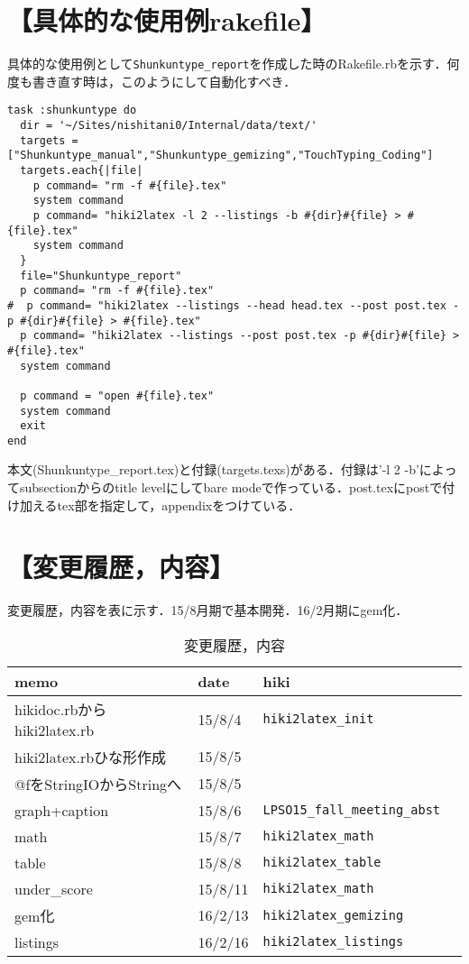 \documentclass[10pt,a4jpaper]{jsarticle}
\begin{document}
\section{【具体的な使用例rakefile】}
具体的な使用例として\verb|Shunkuntype_report|を作成した時のRakefile.rbを示す．何度も書き直す時は，このようにして自動化すべき．
\begin{lstlisting}[style=customRuby]
task :shunkuntype do
  dir = '~/Sites/nishitani0/Internal/data/text/'
  targets =["Shunkuntype_manual","Shunkuntype_gemizing","TouchTyping_Coding"]
  targets.each{|file|
    p command= "rm -f #{file}.tex"
    system command
    p command= "hiki2latex -l 2 --listings -b #{dir}#{file} > #{file}.tex"
    system command
  }
  file="Shunkuntype_report"
  p command= "rm -f #{file}.tex"
#  p command= "hiki2latex --listings --head head.tex --post post.tex -p #{dir}#{file} > #{file}.tex"
  p command= "hiki2latex --listings --post post.tex -p #{dir}#{file} > #{file}.tex"
  system command

  p command = "open #{file}.tex"
  system command
  exit
end
\end{lstlisting}
本文(Shunkuntype\_report.tex)と付録(targets.texs)がある．付録は'-l 2 -b'によってsubsectionからのtitle levelにしてbare modeで作っている．post.texにpostで付け加えるtex部を指定して，appendixをつけている．

\section{【変更履歴，内容】}
変更履歴，内容を表に示す．15/8月期で基本開発．16/2月期にgem化．

\begin{table}[htbp]\begin{center}
\caption{変更履歴，内容}
\begin{tabular}{llll}
\hline
memo   &date  &hiki  \\ \hline
hikidoc.rbからhiki2latex.rb  &15/8/4  &\verb|hiki2latex_init|  \\
hiki2latex.rbひな形作成  &15/8/5  \\
@fをStringIOからStringへ  &15/8/5  \\
graph+caption  &15/8/6  &\verb|LPSO15_fall_meeting_abst|  \\
math  &15/8/7  &\verb|hiki2latex_math|  \\
table  &15/8/8  &\verb|hiki2latex_table|  \\
under\_score  &15/8/11   &\verb|hiki2latex_math|  \\
gem化  &16/2/13   &\verb|hiki2latex_gemizing|  \\
listings  &16/2/16   &\verb|hiki2latex_listings|  \\
\hline
\end{tabular}
\label{default}
\end{center}\end{table}
\end{document}
